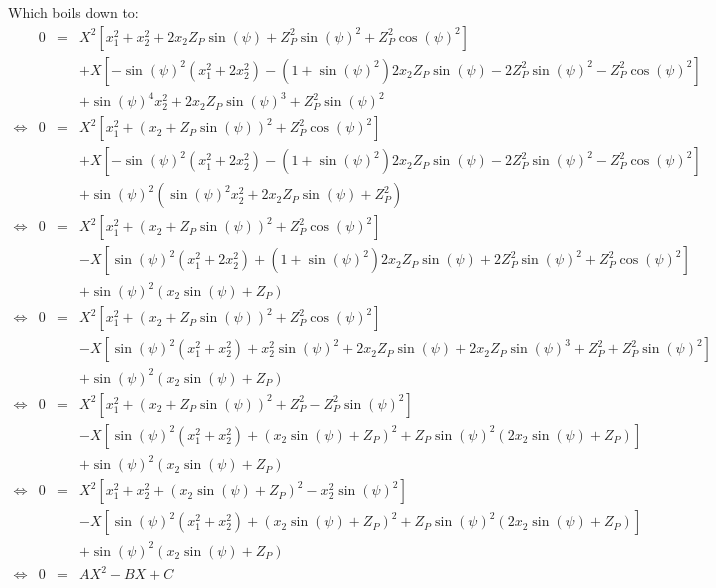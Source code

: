 \documentclass[a4paper,11pt,twoside,titlepage,openright]{book}
\numberwithin{equation}{section}
\newcommand{\lt}{\left}
\newcommand{\rt}{\right}
\begin{document}
Which boils down to:
$$
\begin{array}{lllll}
    & 0 & = & X^2\lt[ x_1^2+x_2^2 + 2x_2Z_P\sin(\psi) + Z_P^2\sin(\psi)^2 + Z_P^2\cos(\psi)^2 \rt]\\
    & & & + X\lt[ -\sin(\psi)^2\lt(x_1^2+2x_2^2\rt) - \lt(1+\sin(\psi)^2\rt)2x_2Z_P\sin(\psi) - 2Z_P^2\sin(\psi)^2 - Z_P^2\cos(\psi)^2\rt]\\
    & & & + \sin(\psi)^4x_2^2 + 2x_2Z_P\sin(\psi)^3 + Z_P^2\sin(\psi)^2\\
    \Leftrightarrow
    & 0 & = & X^2\lt[ x_1^2 + \lt(x_2 + Z_P\sin(\psi)\rt)^2 + Z_P^2\cos(\psi)^2 \rt]\\
    & & & + X\lt[ -\sin(\psi)^2\lt(x_1^2+2x_2^2\rt) - \lt(1+\sin(\psi)^2\rt)2x_2Z_P\sin(\psi) - 2Z_P^2\sin(\psi)^2 - Z_P^2\cos(\psi)^2\rt]\\
    & & & + \sin(\psi)^2\lt(\sin(\psi)^2x_2^2 + 2x_2Z_P\sin(\psi) + Z_P^2\rt)\\
    \Leftrightarrow
    & 0 & = & X^2\lt[ x_1^2 + \lt(x_2 + Z_P\sin(\psi)\rt)^2 + Z_P^2\cos(\psi)^2 \rt]\\
    & & & - X\lt[ \sin(\psi)^2\lt(x_1^2+2x_2^2\rt) + \lt(1+\sin(\psi)^2\rt)2x_2Z_P\sin(\psi) + 2Z_P^2\sin(\psi)^2 + Z_P^2\cos(\psi)^2\rt]\\
    & & & + \sin(\psi)^2\lt(x_2\sin(\psi) + Z_P\rt)\\
    \Leftrightarrow
    & 0 & = & X^2\lt[ x_1^2 + \lt(x_2 + Z_P\sin(\psi)\rt)^2 + Z_P^2\cos(\psi)^2 \rt]\\
    & & & - X\lt[ \sin(\psi)^2\lt(x_1^2+x_2^2\rt) + x_2^2\sin(\psi)^2 + 2x_2Z_P\sin(\psi) + 2x_2Z_P\sin(\psi)^3 + Z_P^2 + Z_P^2\sin(\psi)^2\rt]\\
    & & & + \sin(\psi)^2\lt(x_2\sin(\psi) + Z_P\rt)\\
    \Leftrightarrow
    & 0 & = & X^2\lt[ x_1^2 + \lt(x_2 + Z_P\sin(\psi)\rt)^2 + Z_P^2 - Z_P^2\sin(\psi)^2 \rt]\\
    & & & - X\lt[ \sin(\psi)^2\lt(x_1^2+x_2^2\rt) + \lt(x_2\sin(\psi) + Z_P\rt)^2 + Z_P\sin(\psi)^2\lt(2x_2\sin(\psi) + Z_P\rt)\rt]\\
    & & & + \sin(\psi)^2\lt(x_2\sin(\psi) + Z_P\rt)\\
    \Leftrightarrow
    & 0 & = & X^2\lt[ x_1^2 + x_2^2 + \lt(x_2\sin(\psi) + Z_P\rt)^2 - x_2^2\sin(\psi)^2 \rt]\\
    & & & - X\lt[ \sin(\psi)^2\lt(x_1^2+x_2^2\rt) + \lt(x_2\sin(\psi) + Z_P\rt)^2 + Z_P\sin(\psi)^2\lt(2x_2\sin(\psi) + Z_P\rt)\rt]\\
    & & & + \sin(\psi)^2\lt(x_2\sin(\psi) + Z_P\rt)\\
    \Leftrightarrow
    & 0 & = & AX^2 - BX + C
\end{array}
$$
\end{document}
